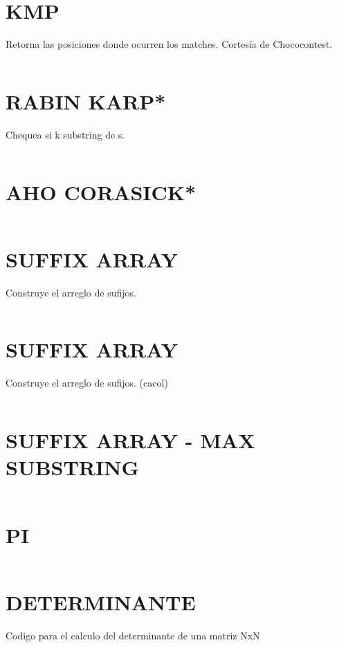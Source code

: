 \documentclass{article}
\begin{document}
\section*{KMP}
Retorna las posiciones donde ocurren los matches.
Cortes\'ia de Chococontest.
\inputminted[]{c++}{algorithms/KMP.cpp}
\newpage

\section*{RABIN KARP*}
Chequea si k substring de s.
\inputminted[]{c++}{algorithms/RABINKARP.cpp}
\newpage

\section*{AHO CORASICK*}
\inputminted[]{c++}{algorithms/AHO.cpp}
\newpage

\section*{SUFFIX ARRAY}
Construye el arreglo de sufijos.
\inputminted[]{c++}{algorithms/SUFFIXARRAY.cpp}
\newpage

\section*{SUFFIX ARRAY}
Construye el arreglo de sufijos. (cacol)
\inputminted[]{c++}{algorithms/SUFFIX.cpp}
\newpage

\section*{SUFFIX ARRAY - MAX SUBSTRING}
\inputminted[]{c++}{algorithms/MAXSUBSTRING.cpp}
\newpage


\section*{PI}
\inputminted[]{c++}{algorithms/PI.cpp}

\section*{DETERMINANTE}
Codigo para el calculo del determinante de una matriz NxN
\inputminted[]{c++}{algorithms/DETERMINANT.cpp}
\newpage
\end{document}
